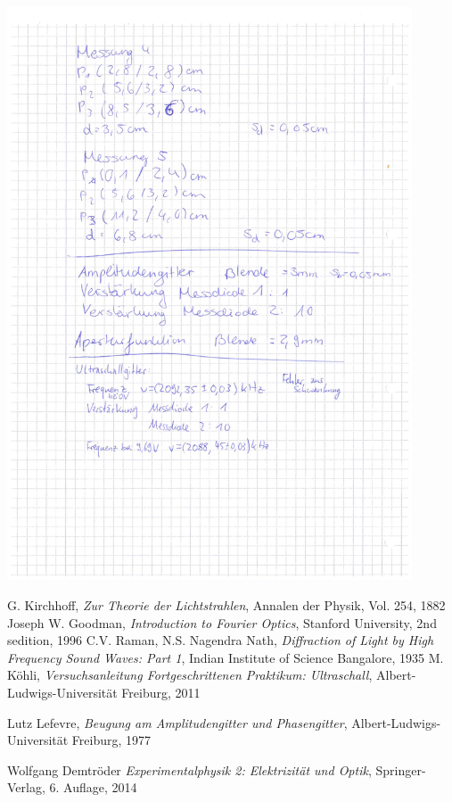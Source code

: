 \documentclass[12pt]{article}
\begin{document}
\begin{minipage}{\textwidth}
\centering
\includegraphics[width=0.9\textwidth]{figures/Laborbuch1.pdf}
\end{minipage}
\newpage
\listoffigures


\newpage
\thispagestyle{empty}
\begin{thebibliography}{9}

  G. Kirchhoff,
  \emph{Zur Theorie der Lichtstrahlen},
  Annalen der Physik,
  Vol. 254,
  1882
  Joseph W. Goodman,
  \emph{Introduction to Fourier Optics},
  Stanford University,
  2nd sedition,
  1996
  C.V. Raman, N.S. Nagendra Nath,
  \emph{Diffraction of Light by High Frequency Sound Waves: Part 1},
  Indian Institute of Science Bangalore,
  1935
  M. Köhli,
  \emph{Versuchsanleitung Fortgeschrittenen Praktikum: Ultraschall},
  Albert-Ludwigs-Universität Freiburg,
  2011
  
  Lutz Lefevre,
  \emph{Beugung am Amplitudengitter und Phasengitter},
  Albert-Ludwigs-Universität Freiburg,
  1977

Wolfgang Demtröder
 \emph{Experimentalphysik 2: Elektrizität und Optik},
 Springer-Verlag,
 6. Auflage,
 2014
\end{thebibliography}
\end{document}
